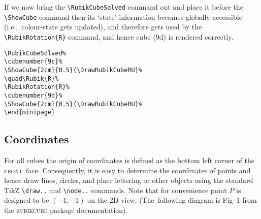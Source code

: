 \documentclass[a4paper]{article}
\newcommand{\cubenumber}[1]{\strut\raisebox{1cm}{#1}}
\newcommand{\frontface}{\textsc{front}\ face}
\begin{document}
\bigskip

If we now bring the \verb!\RubikCubeSolved! command out and place it before 
the \verb!\ShowCube! command then its  `state' information  becomes globally 
accessible (i.e.,~colour-state gets updated), and  therefore  gets used by the  
\verb!\RubikRotation{R}! command, and  hence cube (9d)  is rendered correctly.

\bigskip

\noindent%
\RubikCubeSolved%
\cubenumber{9c}%
%
\quad{}%
%
\cubenumber{9d}%
%
\hspace{5mm}
\begin{minipage}{0.5\textwidth}
\begin{verbatim}
\RubikCubeSolved%
\cubenumber{9c}%
\ShowCube{2cm}{0.5}{\DrawRubikCubeRU}%
\quad\Rubik{R}%
\RubikRotation{R}%
\cubenumber{9d}%
\ShowCube{2cm}{0.5}{\DrawRubikCubeRU}%
\end{minipage}
\end{verbatim}
\end{minipage}




\pagebreak
\subsection{Coordinates}


For all cubes the origin of coordinates is defined as the bottom left corner of 
the \frontface. Consequently, it is easy to determine the coordinates of points 
and hence draw lines, circles, and place lettering or other objects using the 
standard TikZ \verb!\draw..! and \verb!\node..! commands. Note that for 
convenience  point $P$ is designed to be $(-1,-1)$ on the 2D view.
(The~following diagram  is Fig~1 from the \textsc{rubikcube} package documentation).


\begin{figure}[hbt]
\centering
{}   %
\end{figure}
\end{document}
